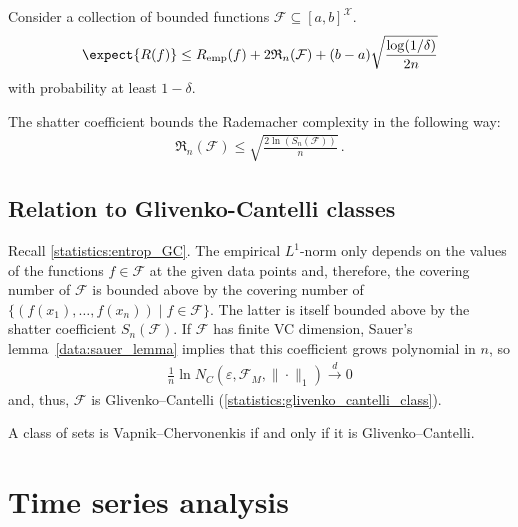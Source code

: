     \begin{property}
        Consider a collection of bounded functions $\mathcal{F}\subseteq[a,b]^{\mathcal{X}}$.
        \begin{gather}
            \expect{R(f)}\leq R_{\text{emp}}(f)+2\mathfrak{R}_n(\mathcal{F})+(b-a)\sqrt{\frac{\log(1/\delta)}{2n}}
        \end{gather}
        with probability at least $1-\delta$.
    \end{property}

    \begin{property}[VC dimension]
        The shatter coefficient bounds the Rademacher complexity in the following way:
        \begin{gather}
            \mathfrak{R}_n(\mathcal{F})\leq\sqrt{\frac{2\ln(S_n(\mathcal{F}))}{n}}\,.
        \end{gather}
    \end{property}

\subsection{Relation to Glivenko-Cantelli classes}

    \begin{property}
        Recall \cref{statistics:entrop_GC}. The empirical $L^1$-norm only depends on the values of the functions $f\in\mathcal{F}$ at the given data points and, therefore, the covering number of $\mathcal{F}$ is bounded above by the covering number of $\{(f(x_1),\ldots,f(x_n))\mid f\in\mathcal{F}\}$. The latter is itself bounded above by the shatter coefficient $S_n(\mathcal{F})$. If $\mathcal{F}$ has finite VC dimension, Sauer's lemma~\ref{data:sauer_lemma} implies that this coefficient grows polynomial in $n$, so
        \begin{gather}
            \frac{1}{n}\ln N_C(\varepsilon,\mathcal{F}_M,\|\cdot\|_1)\overset{d}{\longrightarrow}0
        \end{gather}
        and, thus, $\mathcal{F}$ is Glivenko--Cantelli (\cref{statistics:glivenko_cantelli_class}).
    \end{property}

    \begin{theorem}
        A class of sets is Vapnik--Chervonenkis if and only if it is Glivenko--Cantelli.
    \end{theorem}

\section{Time series analysis}


